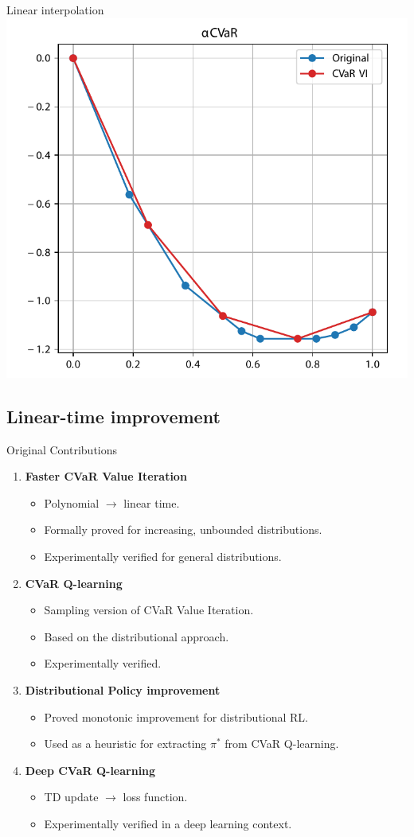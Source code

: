 \documentclass{beamer}
\begin{document}
\begin{frame}{Linear interpolation}
\center
\includegraphics[width=0.6\linewidth]{gfx/acvara_approx.pdf}

\end{frame}


\subsection{Linear-time improvement}

\begin{frame}{Original Contributions}
\center
\begin{enumerate}
\item \textbf{Faster CVaR Value Iteration} 
\begin{itemize}
\item Polynomial $\to$ linear time.
\item Formally proved for increasing, unbounded distributions.
\item Experimentally verified for general distributions.
\end{itemize}
\item \textbf{CVaR Q-learning} 
\begin{itemize}
\item Sampling version of CVaR Value Iteration.
\item Based on the distributional approach.
\item Experimentally verified.
\end{itemize}
\item \textbf{Distributional Policy improvement}
\begin{itemize}
\item Proved monotonic improvement for distributional RL.
\item Used as a heuristic for extracting $\pi^*$ from CVaR Q-learning.
\end{itemize}
\item \textbf{Deep CVaR Q-learning}
\begin{itemize}
\item TD update $\to$ loss function.
\item Experimentally verified in a deep learning context.
\end{itemize}
\end{enumerate}
\end{frame}
\end{document}
